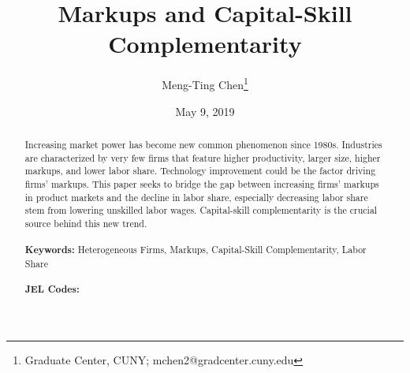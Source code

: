 \documentclass[12pt]{article}
\begin{document}
\begin{titlepage}
\title{\textbf{Markups and Capital-Skill Complementarity}}
\author{Meng-Ting Chen\thanks{Graduate Center, CUNY; mchen2@gradcenter.cuny.edu}}
\date{May 9, 2019}
\maketitle
\begin{abstract}
\noindent Increasing market power has become new common phenomenon since 1980s. Industries are characterized by very few firms that feature higher productivity, larger size, higher markups, and lower labor share. Technology improvement could be the factor driving firms' markups.
This paper seeks to bridge the gap between increasing firms' markups in product markets and the decline in labor share, especially decreasing labor share stem from lowering unskilled labor wages. Capital-skill complementarity is the crucial source behind this new trend.\\
\vspace{0in}\\
\noindent\textbf{Keywords:} Heterogeneous Firms, Markups, Capital-Skill Complementarity, Labor Share\\
\vspace{0in}\\
\noindent\textbf{JEL Codes:} \\

\bigskip
\end{abstract}
\setcounter{page}{0}
\thispagestyle{empty}
\end{titlepage}
\pagebreak \newpage




\doublespacing
\end{document}
